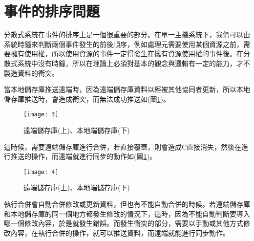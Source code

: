 \section{事件的排序問題}
\par
\renewcommand{\baselinestretch}{1} %
\twelve 分散式系統在事件的排序上是一個很重要的部分。在單一主機系統下，我們可以由系統時鐘來判斷兩個事件發生的前後順序，例如處理元需要使用某個資源之前，需要擁有使用權，所以使用資源的事件一定得發生在擁有資源使用權的事件後。在分散式系統中沒有時鐘，所以在理論上必須對基本的觀念與邏輯有一定的能力，才不製造資料的衝突。
\\
\par
\renewcommand{\baselinestretch}{1} %
\twelve 當本地儲存庫推送遠端時，因為遠端儲存庫資料以經被其他協同者更新，所以本地儲存庫推送時，會造成衝突，而無法成功推送如(圖\ref{fig.衝突})。
\\
\par
\renewcommand{\baselinestretch}{1.7} %
\begin{figure}[hbt!]
\begin{center}
\texttt{[image: 3]}
\caption{\large 遠端儲存庫(上)、本地端儲存庫(下)}\label{fig.衝突}
\end{center}
\end{figure}
\par
\renewcommand{\baselinestretch}{1} %
\twelve 這時候，需要遠端儲存庫進行合併，若直接覆蓋，則會造成C直接消失，然後在進行推送的操作，而遠端就進行同步的動作如(圖\ref{fig.衝突})。
\\
\par
\renewcommand{\baselinestretch}{1.7} %
\begin{figure}[hbt!]
\begin{center}
\texttt{[image: 4]}
\caption{\large 遠端儲存庫(上)、本地端儲存庫(下)}\label{fig.解決衝突}
\end{center}
\end{figure}
\par
\renewcommand{\baselinestretch}{1} %
\twelve 執行合併會自動合併修改或更新資料，但也有不能自動合併的時候。若遠端儲存庫和本地儲存庫的同一個地方都發生修改的情況下，這時，因為不能自動判斷要導入哪一個修改內容，於是就發生錯誤。而發生衝突的部分，需要以手動或其他方式修改內容，在執行合併的操作，就可以推送資料，而遠端就能進行同步動作。
\par